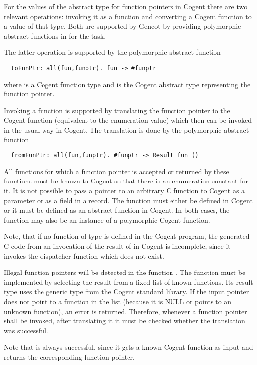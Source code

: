 For the values of the abstract type for function pointers in Cogent there are two relevant operations: invoking
it as a function and converting a Cogent function to a value of that type. Both are supported by Gencot
by providing polymorphic abstract functions in  for the task.

The latter operation is supported by the polymorphic abstract function
\begin{verbatim}
  toFunPtr: all(fun,funptr). fun -> #funptr
\end{verbatim}
where  is a Cogent function type and  is the Cogent abstract type representing the function pointer.

Invoking a function is supported by translating the function pointer to the Cogent function (equivalent to the enumeration value) which
then can be invoked in the usual way in Cogent. The translation is done by the polymorphic abstract function
\begin{verbatim}
  fromFunPtr: all(fun,funptr). #funptr -> Result fun ()
\end{verbatim}

All functions for which a function pointer is accepted or returned by these functions must be known to
Cogent so that there is an enumeration constant for it. It is not possible to pass a pointer to an arbitrary 
C function to Cogent as a parameter or as a field in a record. The function must either be defined in Cogent 
or it must be defined as an abstract function in Cogent. In both cases, the function may also be an instance of
a polymorphic Cogent function. 

Note, that if no function of type  is 
defined in the Cogent program, the generated C code from an invocation of the result of  
in Cogent is incomplete, since it invokes the dispatcher function which does not exist.

Illegal function pointers will be detected in the function . The function must be implemented 
by selecting the result from a fixed list of known functions. Its result type uses the generic type 
from the Cogent standard library. If the input pointer does not point to a 
function in the list (because it is NULL or points to an unknown function), an error is returned. Therefore,
whenever a function pointer shall be invoked, after translating it it must be checked whether the translation
was successful.

Note that  is always successful, since it gets a known Cogent function as input and returns 
the corresponding function pointer.

